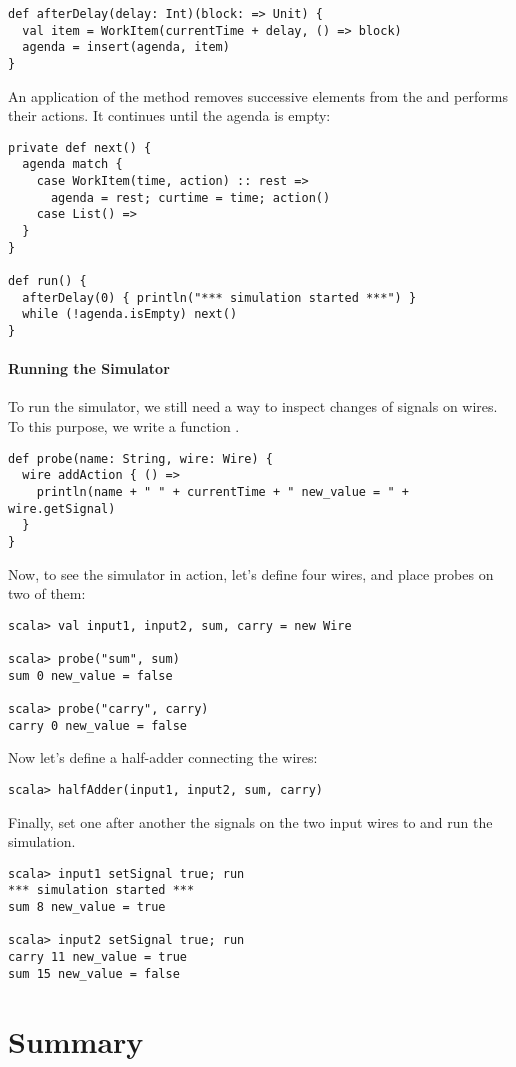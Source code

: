 {\begin{lstlisting}
def afterDelay(delay: Int)(block: => Unit) {
  val item = WorkItem(currentTime + delay, () => block)
  agenda = insert(agenda, item)
}
\end{lstlisting}
An application of the  method removes successive elements
from the  and performs their actions.
It continues until the agenda is empty:
\begin{lstlisting}
private def next() {
  agenda match {
    case WorkItem(time, action) :: rest =>
      agenda = rest; curtime = time; action()
    case List() =>
  }
}

def run() {
  afterDelay(0) { println("*** simulation started ***") }
  while (!agenda.isEmpty) next()
}
\end{lstlisting}

\paragraph{Running the Simulator}
To run the simulator, we still need a way to inspect changes of
signals on wires. To this purpose, we write a function .
\begin{lstlisting}
def probe(name: String, wire: Wire) {
  wire addAction { () =>
    println(name + " " + currentTime + " new_value = " + wire.getSignal)
  }
}
\end{lstlisting}
Now, to see the simulator in action, let's define four wires, and place
probes on two of them: 
\begin{lstlisting}
scala> val input1, input2, sum, carry = new Wire

scala> probe("sum", sum)
sum 0 new_value = false

scala> probe("carry", carry)
carry 0 new_value = false
\end{lstlisting}
Now let's define a half-adder connecting the wires:
\begin{lstlisting}
scala> halfAdder(input1, input2, sum, carry)
\end{lstlisting}
Finally, set one after another the signals on the two input wires to
 and run the simulation.
\begin{lstlisting}
scala> input1 setSignal true; run
*** simulation started ***
sum 8 new_value = true

scala> input2 setSignal true; run
carry 11 new_value = true
sum 15 new_value = false
\end{lstlisting}

\section{Summary}

}
